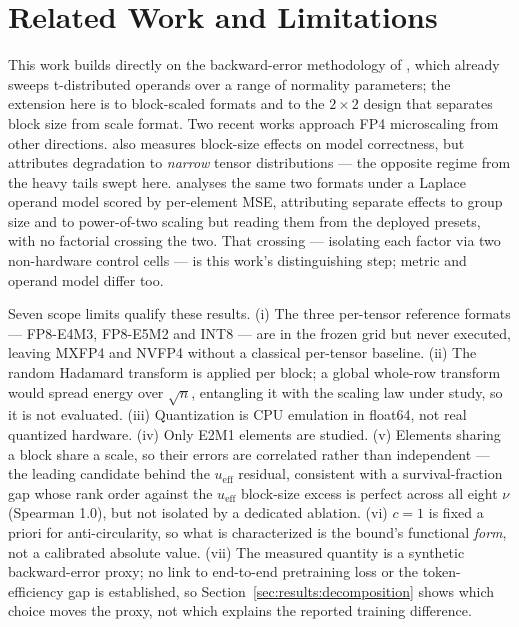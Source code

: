 \section{Related Work and Limitations}
\label{sec:related}

This work builds directly on the backward-error methodology of
\citet{rasquinha2023metric}, which already sweeps t-distributed operands over a
range of normality parameters; the extension here is to block-scaled formats and
to the $2\times2$ design that separates block size from scale format. Two recent
works approach FP4 microscaling from other directions. \citet{fasoli2026finer} also measures block-size effects on model
correctness, but attributes degradation to \emph{narrow} tensor distributions ---
the opposite regime from the heavy tails swept here.
\citet{egiazarian2026bridging} analyses the same two formats under a Laplace
operand model scored by per-element MSE, attributing separate effects to group
size and to power-of-two scaling but reading them from the deployed presets, with
no factorial crossing the two. That crossing --- isolating each factor via two
non-hardware control cells --- is this work's distinguishing step; metric and
operand model differ too.

Seven scope limits qualify these results. (i) The three per-tensor reference
formats --- FP8-E4M3, FP8-E5M2 and INT8 --- are in the frozen grid but never
executed, leaving MXFP4 and NVFP4 without a classical per-tensor baseline.
(ii) The random Hadamard transform is applied per block; a global whole-row
transform would spread energy over $\sqrt{n}$, entangling it with the scaling law
under study, so it is not evaluated.
(iii) Quantization is CPU emulation in float64, not real quantized hardware.
(iv) Only E2M1 elements are studied. (v) Elements sharing a block share a
scale, so their errors are correlated rather than independent --- the leading
candidate behind the $u_{\mathrm{eff}}$ residual, consistent with a
survival-fraction gap whose rank order against the $u_{\mathrm{eff}}$ block-size
excess is perfect across all eight $\nu$ (Spearman 1.0), but not isolated by a
dedicated ablation. (vi) $c = 1$ is fixed a priori for
anti-circularity, so what is characterized is the bound's functional \emph{form},
not a calibrated absolute value. (vii) The measured quantity is a synthetic
backward-error proxy; no link to end-to-end pretraining loss or the
token-efficiency gap \citep{nvidia2026nvfp4} is established, so
Section~\ref{sec:results:decomposition} shows which choice moves the proxy, not
which explains the reported training difference.

